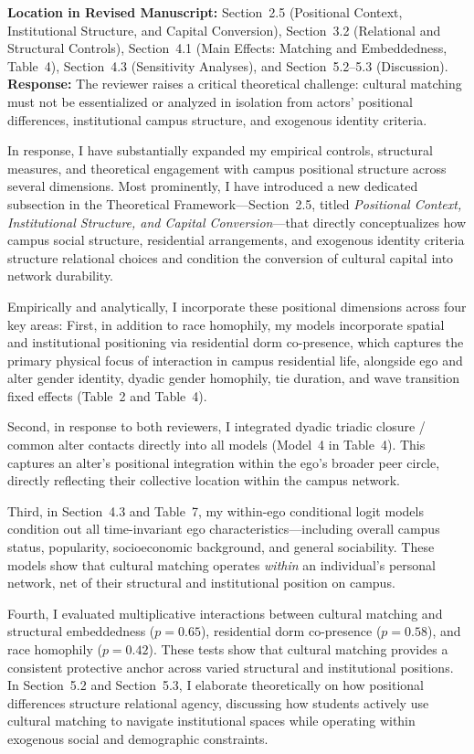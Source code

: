 \documentclass[11pt]{article}
\begin{document}
\noindent\textbf{Location in Revised Manuscript:} Section~2.5 (Positional Context, Institutional Structure, and Capital Conversion), Section~3.2 (Relational and Structural Controls), Section~4.1 (Main Effects: Matching and Embeddedness, Table~4), Section~4.3 (Sensitivity Analyses), and Section~5.2--5.3 (Discussion).\\[4pt]
\textbf{Response:} The reviewer raises a critical theoretical challenge: cultural matching must not be essentialized or analyzed in isolation from actors' positional differences, institutional campus structure, and exogenous identity criteria. 

In response, I have substantially expanded my empirical controls, structural measures, and theoretical engagement with campus positional structure across several dimensions. Most prominently, I have introduced a new dedicated subsection in the Theoretical Framework---Section~2.5, titled \textit{Positional Context, Institutional Structure, and Capital Conversion}---that directly conceptualizes how campus social structure, residential arrangements, and exogenous identity criteria structure relational choices and condition the conversion of cultural capital into network durability.

Empirically and analytically, I incorporate these positional dimensions across four key areas:
First, in addition to race homophily, my models incorporate spatial and institutional positioning via residential dorm co-presence, which captures the primary physical focus of interaction in campus residential life, alongside ego and alter gender identity, dyadic gender homophily, tie duration, and wave transition fixed effects (Table~2 and Table~4).

Second, in response to both reviewers, I integrated dyadic triadic closure / common alter contacts directly into all models (Model~4 in Table~4). This captures an alter's positional integration within the ego's broader peer circle, directly reflecting their collective location within the campus network.

Third, in Section~4.3 and Table~7, my within-ego conditional logit models condition out all time-invariant ego characteristics—including overall campus status, popularity, socioeconomic background, and general sociability. These models show that cultural matching operates \textit{within} an individual's personal network, net of their structural and institutional position on campus.

Fourth, I evaluated multiplicative interactions between cultural matching and structural embeddedness ($p = 0.65$), residential dorm co-presence ($p = 0.58$), and race homophily ($p = 0.42$). These tests show that cultural matching provides a consistent protective anchor across varied structural and institutional positions. In Section~5.2 and Section~5.3, I elaborate theoretically on how positional differences structure relational agency, discussing how students actively use cultural matching to navigate institutional spaces while operating within exogenous social and demographic constraints.
\end{document}
